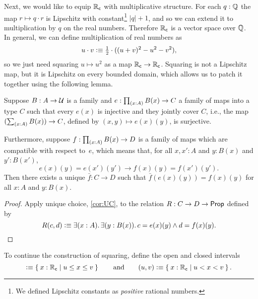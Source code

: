 Next, we would like to equip $\mathbb{R}_\mathsf{c}$ with multiplicative structure. For each $q : \mathbb{Q}$ the
map $r \mapsto q \cdot r$ is Lipschitz with constant\footnote{We defined Lipschitz
  constants as \emph{positive} rational numbers.} $|q| + 1$, and so we can extend it to
multiplication by $q$ on the real numbers. Therefore $\mathbb{R}_\mathsf{c}$ is a vector space over $\mathbb{Q}$.
In general, we can define multiplication of real numbers as
%
\begin{equation*}
  u \cdot v \vcentcolon\equiv
  {\textstyle \frac{1}{2}} \cdot ((u + v)^2 - u^2 - v^2),
\end{equation*}
%
so we just need squaring $u \mapsto u^2$ as a map $\mathbb{R}_\mathsf{c} \to \mathbb{R}_\mathsf{c}$. Squaring is not a
Lipschitz map, but it is Lipschitz on every bounded domain, which allows us to patch it
together using the following lemma.

\begin{lem} \label{lem:patching}
  Suppose $B : A \to \mathcal{U}$ is a family and $e : \prd{x : A} B(x) \to C$ a family of maps
  into a type $C$ such that every $e(x)$ is injective and they jointly cover $C$, i.e.,
  the map $(\sm{x : A} B(x)) \to C$, defined by $(x,y) \mapsto e(x)(y)$, is surjective.

  Furthermore, suppose $f : \prd{x : A} B(x) \to D$ is a family of maps which are
  compatible with respect to~$e$, which means that, for all $x, x' : A$ and $y : B(x)$ and
  $y' : B(x')$,
  \begin{equation*}
    e(x)(y) = e(x')(y') \to f(x)(y) = f(x')(y').
  \end{equation*}
  Then there exists a unique $\bar{f} : C \to D$ such that $\bar{f}(e(x)(y)) = f(x)(y)$
  for all $x : A$ and $y : B(x)$.
\end{lem}

\begin{proof}
  Apply unique choice, \autoref{cor:UC}, to the relation $R : C \to D \to \mathsf{Prop}$ defined
  by
  \begin{equation*}
    R(c, d) \defeq
    \exis{x : A}{y : B(x)} c = e(x)(y) \land d = f(x)(y).
  \end{equation*}
\end{proof}

To continue the construction of squaring, define the open and closed intervals
%
\begin{equation*}
  [u,v] \defeq \setof{ x : \RC | u \leq x \leq v }
  \qquad\text{and}\qquad
  (u,v) \defeq \setof{ x : \RC | u < x < v }.
\end{equation*}

